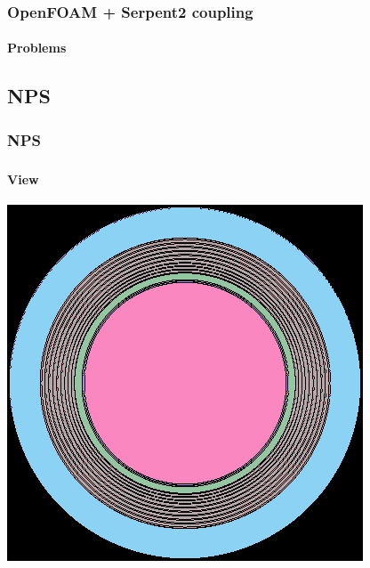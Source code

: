 \documentclass[svgnames,smaller,table]{beamer}
\begin{document}
\begin{frame}
  \frametitle{OpenFOAM + Serpent2 coupling}
  \framesubtitle{Problems}
  \begin{center}
    

  \end{center}
\end{frame}



\subsection{NPS}
\begin{frame}
  \frametitle{NPS}
  \framesubtitle{}

\frametitle{}
  \framesubtitle{View}
  \begin{center}
    \includegraphics[scale=0.4]{figuras/fusion.png}
    \label{fusion}
  \end{center}
\end{frame}
\end{document}
